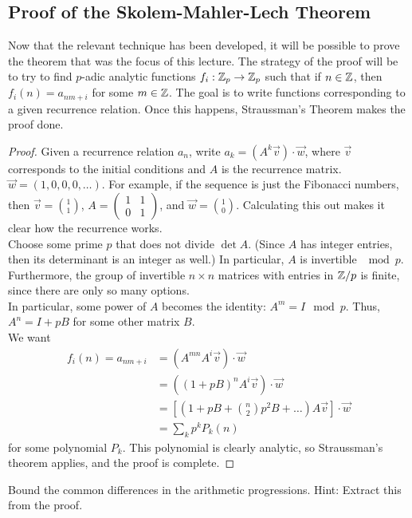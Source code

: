 \subsection{Proof of the Skolem-Mahler-Lech Theorem}
Now that the relevant technique has been developed, it will be possible to prove the theorem that was the focus of this lecture. The strategy of the proof will be to try to find $p$-adic analytic functions $f_i:\mathbb{Z}_p\to\mathbb{Z}_p$ such that if $n\in\mathbb{Z}$, then $f_i(n) = a_{nm+i}$ for some $m\in\mathbb{Z}$. The goal is to write functions corresponding to a given recurrence relation. Once this happens, Straussman's Theorem makes the proof done.
\begin{proof}
Given a recurrence relation $a_n$, write $a_k = (A^k\vec v)\cdot \vec w$, where $\vec v$ corresponds to the initial conditions and $A$ is the recurrence matrix. $\vec w = (1,0,0,0,\dots)$. For example, if the sequence is just the Fibonacci numbers, then $\vec v = \displaystyle\binom{1}{1}$, $A = 
\begin{pmatrix}1&1\\0&1\end{pmatrix}$, and $\vec w = \displaystyle\binom{1}{0}$. Calculating this out makes it clear how the recurrence works.\\
Choose some prime $p$ that does not divide $\det A$. (Since $A$ has integer entries, then its determinant is an integer as well.) In particular, $A$ is invertible $\mod p$. Furthermore, the group of invertible $n\times n$ matrices with entries in $\mathbb{Z}/p$ is finite, since there are only so many options.\\
In particular, some power of $A$ becomes the identity: $A^m = I\mod p$. Thus, $A^n = I + pB$ for some other matrix $B$.\\
We want 
\begin{align*}
f_i(n) = a_{nm+i} &= (A^{mn}A^i\vec v)\cdot \vec w\\
& = ((1+pB)^nA^i\vec v)\cdot \vec w\\
&= \left[\left(1+pB+\binom{n}{2}p^2B + \dots\right)A\vec v\right]\cdot \vec w\\
&= \sum_k p^k P_k(n)
\end{align*}
for some polynomial $P_k$. This polynomial is clearly analytic, so Straussman's theorem applies, and the proof is complete.
\end{proof}
\begin{ex}
Bound the common differences in the arithmetic progressions. Hint: Extract this from the proof.
\end{ex}
